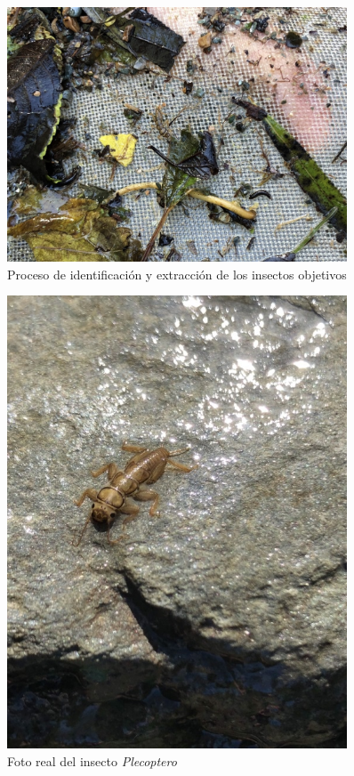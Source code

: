 		\begin{figure}[H]
			\centering
				\includegraphics[width=0.9\textwidth]{imagenes/testAlpha/4.JPG}
					\caption{Proceso de identificación y extracción de los insectos objetivos}
		\end{figure}
		\begin{figure}[H]
			\centering
				\includegraphics[width=0.9\textwidth]{imagenes/testAlpha/5.JPG}
					\caption{Foto real del insecto \textit{Plecoptero}}
		\end{figure}
